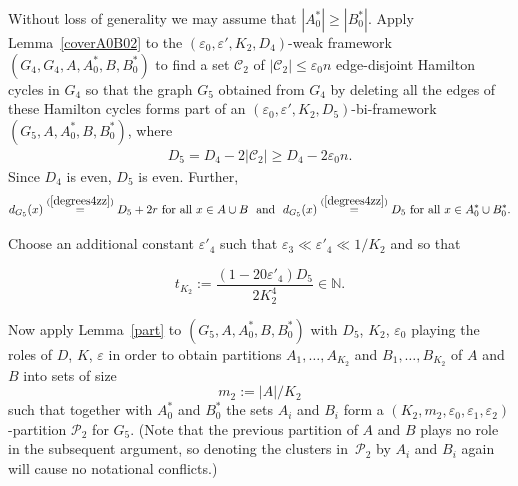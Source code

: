 \documentclass{memo-l}
\def\COMMENT#1{}
\def\cP{\mathcal{P}}
\def\eps{\varepsilon}
\def\epszero{\eps_0}
\numberwithin{section}{chapter}
\numberwithin{equation}{section}
\numberwithin{firstthm}{section}
\numberwithin{figure}{section}
\begin{document}
{Without loss of generality we may assume that $|A^*_0|\geq |B^*_0|$.
Apply Lem\-ma~\ref{coverA0B02} to the $(\eps_0,\eps',K_2,D_4)$-weak framework $(G_4,G_4,A,A_0^*,B,B_0^*)$ to find a set $\mathcal C_2$ of $|\mathcal C_2| \leq \eps _0 n$ edge-disjoint Hamilton cycles in $G_4$ so that the graph $G_5$
obtained from $G_4$ by deleting all the edges of these Hamilton cycles forms part of an
$(\eps_0,\eps',K_2,D_5)$-bi-framework $(G_5,A,A_0^*,B,B_0^*)$, where
\begin{align}\label{eqD5}
D_5=D_4-2|\mathcal C_2| \geq D_4 -2\eps _0 n.
\end{align}
Since $D_4$ is even, $D_5$ is even. Further, 
\begin{equation} \label{degrees5zz}
d_{G_5}(x)\stackrel{(\ref{degrees4zz})}{=} D_5+2r \mbox{ for all } x \in A \cup B \ \ \mbox{and} \ \ d_{G_5}(x)\stackrel{(\ref{degrees4zz})}{=}D_5 \mbox{ for all } x \in A^*_0\cup B^*_0.
\end{equation}


Choose an additional constant $\eps '_4$ such that $\eps _3 \ll \eps '_4 \ll 1/K_2$ and so
that%
\COMMENT{Vital: we have had to wait until now to define $\eps '_4$, since it depends on $D_5$ and
$D_5$ only just defined. In particular, $D_5$ depends on $|\mathcal C_2|$.}
$$t_{K_2}:=\frac{(1-20\eps'_4)D_5}{2K_2^4} \in \mathbb N.$$

Now apply Lemma~\ref{part} to $(G_5,A,A_0^*,B,B_0^*)$ with $D_5$, $K_2$, $\eps_0$
playing the roles of $D$, $K$, $\eps$ in order to obtain partitions $A_1,\dots,A_{K_2}$ and
$B_1,\dots,B_{K_2}$ of $A$ and $B$ into sets of size 
\begin{equation} \label{m2def}
m_2:=|A|/K_2
\end{equation} such that together with $A^*_0$ and $B^*_0$ the sets
$A_i$ and $B_i$ form a $(K_2,m_2,\eps_0,\eps_1,\eps_2)$-partition $\cP_2$ for $G_5$.
(Note that the previous partition of $A$ and $B$  plays no role in the subsequent argument, so
denoting the clusters in~$\cP_2$ by $A_i$ and $B_i$ again will cause no notational conflicts.)%
   \COMMENT{Daniela deleted an entire paragraph verifying that $G'_5:=G_5[A,B]$ is part of a bi-scheme since this is not used anymore}

}
\end{document}

